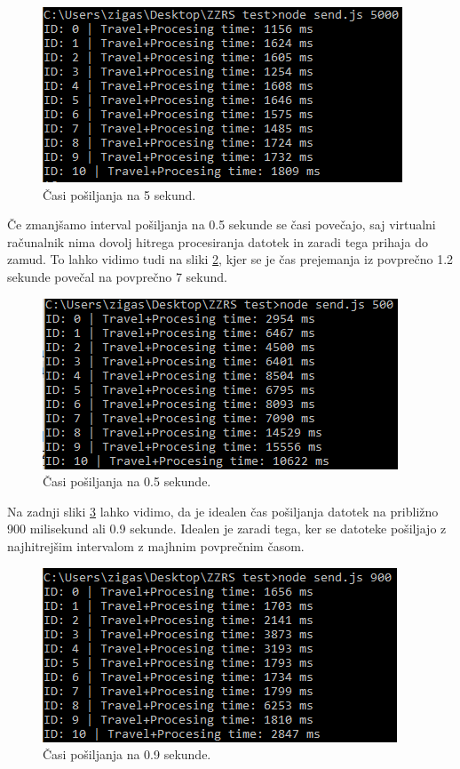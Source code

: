 \begin{figure}[H]
    \centering
    \includegraphics[scale=0.8]{Img/breme1.png}
    \caption{Časi pošiljanja na 5 sekund.}
    \label{fig:7_breme1}
\end{figure}

Če zmanjšamo interval pošiljanja na 0.5 sekunde se časi povečajo, saj virtualni računalnik nima dovolj hitrega procesiranja datotek in zaradi tega prihaja do zamud. To lahko vidimo tudi na sliki \ref{fig:7_breme2}, kjer se je čas prejemanja iz povprečno 1.2 sekunde povečal na povprečno 7 sekund.

\begin{figure}[H]
    \centering
    \includegraphics[scale=0.8]{Img/breme2.png}
    \caption{Časi pošiljanja na 0.5 sekunde.}
    \label{fig:7_breme2}
\end{figure}

Na zadnji sliki \ref{fig:7_breme3} lahko vidimo, da je idealen čas pošiljanja datotek na približno 900 milisekund ali 0.9 sekunde. Idealen je zaradi tega, ker se datoteke pošiljajo z najhitrejšim intervalom z majhnim povprečnim časom.

\begin{figure}[H]
    \centering
    \includegraphics[scale=0.8]{Img/breme3.png}
    \caption{Časi pošiljanja na 0.9 sekunde.}
    \label{fig:7_breme3}
\end{figure}

